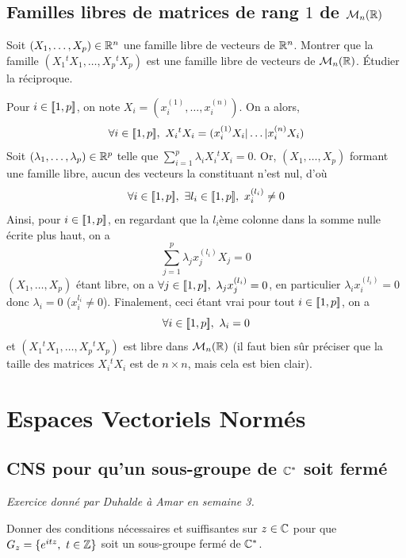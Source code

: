 \subsection{Familles libres de matrices de rang $1$ de $\mathcal M_n(\mathbb{R})$}
\begin{exo}
	Soit $(X_1,\dots,X_p)\in\mathbb{R}^n$ une famille libre de vecteurs de $\mathbb{R}^n$. Montrer que la famille $(X_1{}^tX_1,\dots,X_p{}^tX_p)$ est une famille libre de vecteurs de $\mathcal M_n(\mathbb{R})$. Étudier la réciproque.
\end{exo}
\begin{sol}
Pour $i\in[\![1,p]\!]$, on note $X_i=(x_i^{(1)},\dots,x_i^{(n)})$. On a alors, \[\forall i\in\inl1p,\ X_i{}^tX_i=(x_i^{(1)}X_i|\dots|x_i^{(n)}X_i)\]
Soit $(\lambda_1,\dots,\lambda_p)\in\mathbb{R}^p$ telle que $\sum_{i=1}^p\lambda_iX_i{}^tX_i=0$. Or, $(X_1,\dots,X_p)$ formant une famille libre, aucun des vecteurs la constituant n'est nul, d'où \[\forall i\in[\![1,p]\!],\ \exists l_i\in[\![1,p]\!],\ x_i^{(l_i)}\neq 0\]
Ainsi, pour $i\in[\![1,p]\!]$, en regardant que la $l_i$ème colonne dans la somme nulle écrite plus haut, on a \[\sum_{j=1}^p\lambda_jx_j^{(l_i)}X_j=0\]
$(X_1,\dots,X_p)$ étant libre, on a $\forall j\in\inl1p,\ \lambda_jx_j^{(l_i)}=0$, en particulier $\lambda_ix_i^{(l_i)}=0$ donc $\lambda_i=0$ ($x_i^{l_i}\neq 0$). Finalement, ceci étant vrai pour tout $i\in[\![1,p]\!]$, on a \[\forall i\in[\![1,p]\!],\ \lambda_i=0\]
et $(X_1{}^tX_1,\dots,X_p{}^tX_p)$ est libre dans $\mathcal M_n(\mathbb{R})$ (il faut bien sûr préciser que la taille des matrices $X_i{}^tX_i$ est de $n\times n$, mais cela est bien clair).
\end{sol}

%
%

\newpage
\section[Espaces Vectoriels Normés]{Espaces Vectoriels Normés}
\subsection{CNS pour qu'un sous-groupe de $\mathbb{C}^*$ soit fermé}

\textit{Exercice donné par Duhalde à Amar en semaine 3.}
\begin{exo}
Donner des conditions nécessaires et suiffisantes sur $z\in\mathbb{C}$ pour que $G_z=\lbrace e^{itz},\ t\in\mathbb{Z}\rbrace$ soit un sous-groupe fermé de $\mathbb{C}^*$.
\end{exo}

